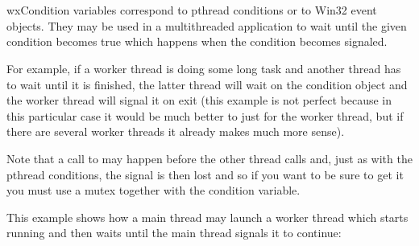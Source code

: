 \section{}\label{wxcondition}

wxCondition variables correspond to pthread conditions or to Win32 event
objects. They may be used in a multithreaded application to wait until the
given condition becomes true which happens when the condition becomes signaled.

For example, if a worker thread is doing some long task and another thread has
to wait until it is finished, the latter thread will wait on the condition
object and the worker thread will signal it on exit (this example is not
perfect because in this particular case it would be much better to just 
 for the worker thread, but if there are several
worker threads it already makes much more sense).

Note that a call to  may happen before the
other thread calls  and, just as with the
pthread conditions, the signal is then lost and so if you want to be sure to
get it you must use a mutex together with the condition variable.


This example shows how a main thread may launch a worker thread which starts
running and then waits until the main thread signals it to continue:

